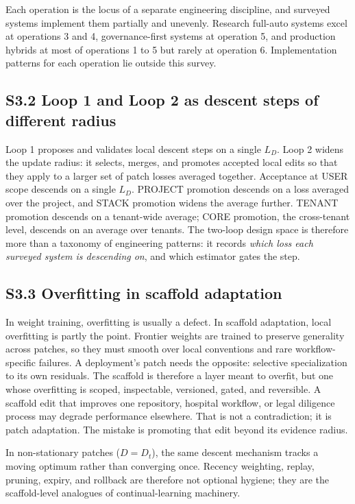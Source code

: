 \documentclass[
]{article}
\begin{document}
Each operation is the locus of a separate engineering discipline, and
surveyed systems implement them partially and unevenly. Research
full-auto systems excel at operations 3 and 4, governance-first systems
at operation 5, and production hybrids at most of operations 1 to 5 but
rarely at operation 6. Implementation patterns for each operation lie
outside this survey.

\subsection{S3.2 Loop 1 and Loop 2 as descent steps of different
radius}\label{s3.2-loop-1-and-loop-2-as-descent-steps-of-different-radius}

Loop 1 proposes and validates local descent steps on a single \(L_D\).
Loop 2 widens the update radius: it selects, merges, and promotes
accepted local edits so that they apply to a larger set of patch losses
averaged together. Acceptance at USER scope descends on a single
\(L_D\). PROJECT promotion descends on a loss averaged over the project,
and STACK promotion widens the average further. TENANT promotion
descends on a tenant-wide average; CORE promotion, the cross-tenant
level, descends on an average over tenants. The two-loop design space is
therefore more than a taxonomy of engineering patterns: it records
\emph{which loss each surveyed system is descending on}, and which
estimator gates the step.

\subsection{S3.3 Overfitting in scaffold
adaptation}\label{s3.3-overfitting-in-scaffold-adaptation}

In weight training, overfitting is usually a defect. In scaffold
adaptation, local overfitting is partly the point. Frontier weights are
trained to preserve generality across patches, so they must smooth over
local conventions and rare workflow-specific failures. A deployment's
patch needs the opposite: selective specialization to its own residuals.
The scaffold is therefore a layer meant to overfit, but one whose
overfitting is scoped, inspectable, versioned, gated, and reversible. A
scaffold edit that improves one repository, hospital workflow, or legal
diligence process may degrade performance elsewhere. That is not a
contradiction; it is patch adaptation. The mistake is promoting that
edit beyond its evidence radius.

In non-stationary patches (\(D = D_t\)), the same descent mechanism
tracks a moving optimum rather than converging once. Recency weighting,
replay, pruning, expiry, and rollback are therefore not optional
hygiene; they are the scaffold-level analogues of continual-learning
machinery.
\end{document}
